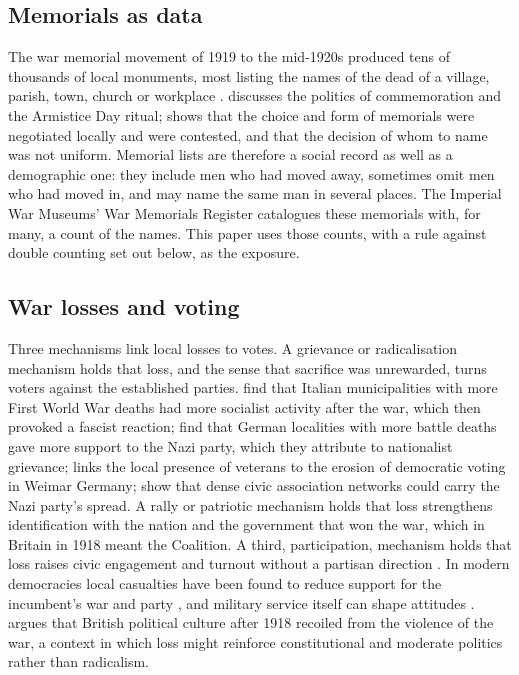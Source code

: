 \documentclass[11pt,a4paper]{article}
\begin{document}
\subsection{Memorials as data}
The war memorial movement of 1919 to the mid-1920s produced tens of thousands of local monuments, most listing the names of the dead of a village, parish, town, church or workplace \citep{king1998,winter1995}. \citet{gregory1994,gregory2008} discusses the politics of commemoration and the Armistice Day ritual; \citet{king1998} shows that the choice and form of memorials were negotiated locally and were contested, and that the decision of whom to name was not uniform. Memorial lists are therefore a social record as well as a demographic one: they include men who had moved away, sometimes omit men who had moved in, and may name the same man in several places. The Imperial War Museums' War Memorials Register catalogues these memorials with, for many, a count of the names. This paper uses those counts, with a rule against double counting set out below, as the exposure.

\subsection{War losses and voting}
Three mechanisms link local losses to votes. A grievance or radicalisation mechanism holds that loss, and the sense that sacrifice was unrewarded, turns voters against the established parties. \citet{acemoglu2022} find that Italian municipalities with more First World War deaths had more socialist activity after the war, which then provoked a fascist reaction; \citet{dejuan2024} find that German localities with more battle deaths gave more support to the Nazi party, which they attribute to nationalist grievance; \citet{koenig2023} links the local presence of veterans to the erosion of democratic voting in Weimar Germany; \citet{satyanath2017} show that dense civic association networks could carry the Nazi party's spread. A rally or patriotic mechanism holds that loss strengthens identification with the nation and the government that won the war, which in Britain in 1918 meant the Coalition. A third, participation, mechanism holds that loss raises civic engagement and turnout without a partisan direction \citep{blattman2009,bellows2009,bauer2016,carozzi2023}. In modern democracies local casualties have been found to reduce support for the incumbent's war and party \citep{gartner1997,karol2007,kriner2007}, and military service itself can shape attitudes \citep{grossman2015}. \citet{lawrence2003} argues that British political culture after 1918 recoiled from the violence of the war, a context in which loss might reinforce constitutional and moderate politics rather than radicalism.
\end{document}
